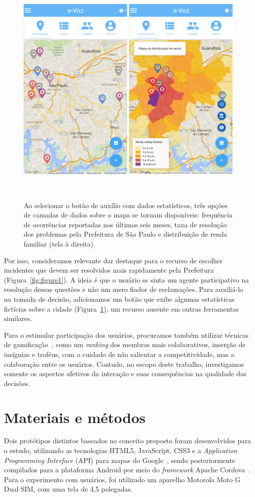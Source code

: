 \documentclass{sigchi}
\begin{document}
\begin{figure}
	\centering
	\includegraphics[width=0.85\columnwidth]{figures/prototipo2b}
	\caption{Ao selecionar o botão de auxílio com dados estatísticos, três opções de camadas de dados sobre o mapa se tornam disponíveis: frequência de ocorrências reportadas nos últimos seis meses, taxa de resolução dos problemas pela Prefeitura de São Paulo e distribuição de renda familiar (tela à direita).  }~\label{fig:figure2}
\end{figure}

Por isso, consideramos relevante dar destaque para o recurso de escolher incidentes que devem ser resolvidos mais rapidamente pela Prefeitura (Figura~\ref{fig:figure1}). A ideia é que o usuário se sinta um agente participativo na resolução dessas questões e não um mero fiador de reclamações. Para auxiliá-lo na tomada de decisão, adicionamos um botão que exibe algumas estatísticas fictícias sobre a cidade (Figura~\ref{fig:figure2}), um recurso ausente em outras ferramentas similares.


Para o estimular participação dos usuários, procuramos também utilizar técnicas de gamificação~\cite{deterding:2011}, como um \textit{ranking} dos membros mais colaborativos, inserção de insígnias e troféus, com o cuidado de não salientar a competitividade, mas a colaboração entre os usuários. Contudo, no escopo deste trabalho, investigamos somente os aspectos afetivos da interação e suas consequências na qualidade das decisões. 


\section{Materiais e métodos}
Dois protótipos distintos baseados no conceito proposto foram desenvolvidos para o estudo, utilizando as tecnologias HTML5, JavaScript, CSS3 e a \textit{Application Programming Interface} (API) para mapas do Google~\cite{googlemaps:2016}, sendo posteriormente compilados para a plataforma Android por meio do \textit{framework} Apache Cordova~\cite{cordova:2016}. Para o experimento com usuários, foi utilizado um aparelho Motorola Moto G Dual SIM, com uma tela de 4,5 polegadas.
\end{document}
